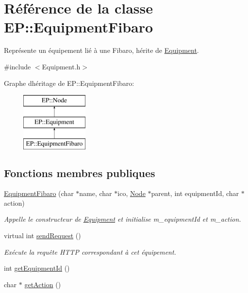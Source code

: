 \hypertarget{class_e_p_1_1_equipment_fibaro}{}\section{Référence de la classe EP\+:\+:Equipment\+Fibaro}
\label{class_e_p_1_1_equipment_fibaro}


Représente un équipement lié à une Fibaro, hérite de \hyperlink{class_e_p_1_1_equipment}{Equipment}.  




{\ttfamily \#include $<$Equipment.\+h$>$}

Graphe d\textquotesingle{}héritage de EP\+:\+:Equipment\+Fibaro\+:\begin{figure}[H]
\begin{center}
\leavevmode
\includegraphics[height=3.000000cm]{class_e_p_1_1_equipment_fibaro}
\end{center}
\end{figure}
\subsection*{Fonctions membres publiques}
\begin{DoxyCompactItemize}
\item 
\hyperlink{class_e_p_1_1_equipment_fibaro_a1aceacf1010faf9042e2a5a4c2f79ae8}{Equipment\+Fibaro} (char $\ast$name, char $\ast$ico, \hyperlink{class_e_p_1_1_node}{Node} $\ast$parent, int equipment\+Id, char $\ast$action)
\begin{DoxyCompactList}\small\item\em Appelle le constructeur de \hyperlink{class_e_p_1_1_equipment}{Equipment} et initialise m\+\_\+equipment\+Id et m\+\_\+action. \end{DoxyCompactList}\item 
virtual int \hyperlink{class_e_p_1_1_equipment_fibaro_aff3a8468127e7915e1757d8b9b600587}{send\+Request} ()\hypertarget{class_e_p_1_1_equipment_fibaro_aff3a8468127e7915e1757d8b9b600587}{}\label{class_e_p_1_1_equipment_fibaro_aff3a8468127e7915e1757d8b9b600587}

\begin{DoxyCompactList}\small\item\em Exécute la requête H\+T\+TP correspondant à cet équipement. \end{DoxyCompactList}\item 
int \hyperlink{class_e_p_1_1_equipment_fibaro_abdd7cbd67d1f3a06dd57fa9dc3b33a59}{get\+Equipment\+Id} ()
\item 
char $\ast$ \hyperlink{class_e_p_1_1_equipment_fibaro_ad411fa6e04286c4b0eabf258226c95f3}{get\+Action} ()
\end{DoxyCompactItemize}
